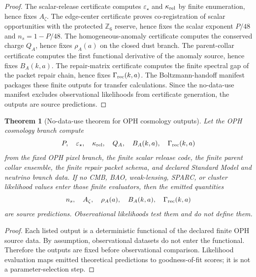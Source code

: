 \documentclass[11pt]{article}
\newtheorem{theorem}{Theorem}[section]
\newcommand{\Zsix}{\mathbb Z_6}
\begin{document}
\begin{proof}
The scalar-release certificate computes \(\varepsilon_\star\) and \(\kappa_{\rm rel}\) by finite
enumeration, hence fixes \(A_\zeta\). The edge-center certificate proves co-registration of scalar
opportunities with the protected \(\Zsix\) reserve, hence fixes the scalar exponent \(P/48\) and
\(n_s=1-P/48\). The homogeneous-anomaly certificate computes the conserved charge \(Q_A\), hence
fixes \(\rho_A(a)\) on the closed dust branch. The parent-collar certificate computes the first
functional derivative of the anomaly source, hence fixes \(B_A(k,a)\). The repair-matrix
certificate computes the finite spectral gap of the packet repair chain, hence fixes
\(\Gamma_{\rm rec}(k,a)\). The Boltzmann-handoff manifest packages these finite outputs for
transfer calculations. Since the no-data-use manifest excludes observational likelihoods from
certificate generation, the outputs are source predictions.
\end{proof}

\begin{theorem}[No-data-use theorem for OPH cosmology outputs]\label{thm:no-data-use}
Let the OPH cosmology branch compute
\[
P,\quad
\varepsilon_\star,\quad
\kappa_{\rm rel},\quad
Q_A,\quad
B_A(k,a),\quad
\Gamma_{\rm rec}(k,a)
\]
from the fixed OPH pixel branch, the finite scalar release code, the finite parent collar ensemble,
the finite repair packet schema, and declared Standard Model and neutrino branch data. If no CMB,
BAO, weak-lensing, SPARC, or cluster likelihood values enter those finite evaluators, then the
emitted quantities
\[
n_s,\quad
A_\zeta,\quad
\rho_A(a),\quad
B_A(k,a),\quad
\Gamma_{\rm rec}(k,a)
\]
are source predictions. Observational likelihoods test them and do not define them.
\end{theorem}

\begin{proof}
Each listed output is a deterministic functional of the declared finite OPH source data. By
assumption, observational datasets do not enter the functional. Therefore the outputs are fixed
before observational comparison. Likelihood evaluation maps emitted theoretical predictions to
goodness-of-fit scores; it is not a parameter-selection step.
\end{proof}
\end{document}
